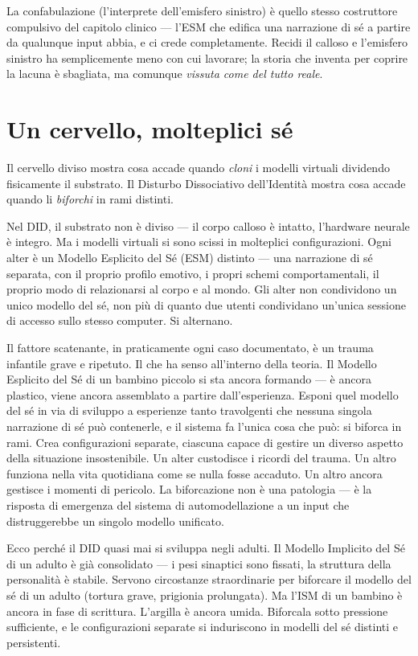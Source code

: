 \documentclass[11pt, twoside, openright]{book}
\begin{document}
La confabulazione (l'interprete dell'emisfero sinistro) è quello stesso costruttore compulsivo del capitolo clinico --- l'ESM che edifica una narrazione di sé a partire da qualunque input abbia, e ci crede completamente. Recidi il calloso e l'emisfero sinistro ha semplicemente meno con cui lavorare; la storia che inventa per coprire la lacuna è sbagliata, ma comunque \textit{vissuta come del tutto reale}.

\section*{Un cervello, molteplici sé}

Il cervello diviso mostra cosa accade quando \textit{cloni} i modelli virtuali dividendo fisicamente il substrato. Il Disturbo Dissociativo dell'Identità mostra cosa accade quando li \textit{biforchi} in rami distinti.

Nel DID, il substrato non è diviso --- il corpo calloso è intatto, l'hardware neurale è integro. Ma i modelli virtuali si sono scissi in molteplici configurazioni. Ogni alter è un Modello Esplicito del Sé (ESM) distinto --- una narrazione di sé separata, con il proprio profilo emotivo, i propri schemi comportamentali, il proprio modo di relazionarsi al corpo e al mondo. Gli alter non condividono un unico modello del sé, non più di quanto due utenti condividano un'unica sessione di accesso sullo stesso computer. Si alternano.

Il fattore scatenante, in praticamente ogni caso documentato, è un trauma infantile grave e ripetuto. Il che ha senso all'interno della teoria. Il Modello Esplicito del Sé di un bambino piccolo si sta ancora formando --- è ancora plastico, viene ancora assemblato a partire dall'esperienza. Esponi quel modello del sé in via di sviluppo a esperienze tanto travolgenti che nessuna singola narrazione di sé può contenerle, e il sistema fa l'unica cosa che può: si biforca in rami. Crea configurazioni separate, ciascuna capace di gestire un diverso aspetto della situazione insostenibile. Un alter custodisce i ricordi del trauma. Un altro funziona nella vita quotidiana come se nulla fosse accaduto. Un altro ancora gestisce i momenti di pericolo. La biforcazione non è una patologia --- è la risposta di emergenza del sistema di automodellazione a un input che distruggerebbe un singolo modello unificato.

Ecco perché il DID quasi mai si sviluppa negli adulti. Il Modello Implicito del Sé di un adulto è già consolidato --- i pesi sinaptici sono fissati, la struttura della personalità è stabile. Servono circostanze straordinarie per biforcare il modello del sé di un adulto (tortura grave, prigionia prolungata). Ma l'ISM di un bambino è ancora in fase di scrittura. L'argilla è ancora umida. Biforcala sotto pressione sufficiente, e le configurazioni separate si induriscono in modelli del sé distinti e persistenti.
\end{document}
